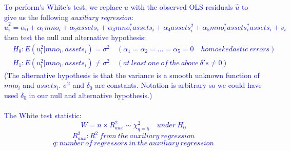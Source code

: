 \documentclass[12pt]{report}
\newenvironment{blueframed}[1][blue]
{\def\FrameCommand{\fboxsep=\FrameSep\fcolorbox{#1}{white}}%
\MakeFramed {\advance\hsize-\width \FrameRestore}}
{\endMakeFramed}
\begin{document}
\begin{blueframed}
	\vspace{-\baselineskip}
	\justify
	\noindent \textcolor{blue}
	{	To perform's White's test, we replace $u$ with the observed OLS residuals $\hat{u}$ to give us the following \textit{auxiliary regression}: $$\hat{u}^2_i = \alpha_0 + \alpha_1 mno_i + \alpha_2 assets_i + \alpha_3 mno_i ^* assets_i + \alpha_4 assets_i^2 + \alpha_5 mno_i^*assets_i^*assets_i + v_i$$ then test the null and alternative hypothesis: \begin{align*}
		&H_0: E(u^2_i|mno_i,assets_i) = \sigma^2 \quad (\alpha_1 = \alpha_2 = \dots = \alpha_5 = 0 \quad homoskedastic\ errors) \\
		&H_1: E(u^2_i|mno_i,assets_i) \neq \sigma^2 \quad (at\ least\ one\ of\ the\ above\ \delta's \neq 0)
		\end{align*} (The alternative hypothesis is that the variance is a smooth unknown function of $mno_i$ and $assets_i$. $\sigma^2$ and $\delta_0$ are constants. Notation is arbitrary so we could have used $\delta_0$ in our null and alternative hypothesis.) \\ \\
		The White test statistic:
		$$W = n \times R^2_{aux} \sim \chi_{q=5}^2 \quad under\ H_0$$ $$R^2_{aux}: R^2\ from\ the\ auxiliary\ regression$$ $$q:number\ of\ regressors\ in\ the\ auxiliary\ regression$$
	}
\end{blueframed}
\end{document}
